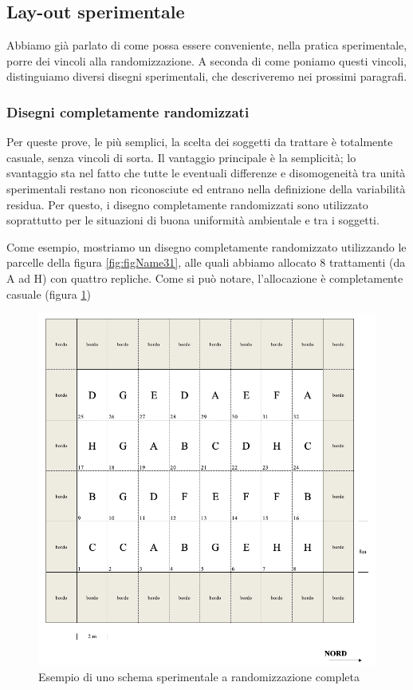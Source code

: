 \documentclass[a4paper,12pt,oneside]{book}
\begin{document}
\hypertarget{lay-out-sperimentale}{%
\subsection{Lay-out sperimentale}\label{lay-out-sperimentale}}

Abbiamo già parlato di come possa essere conveniente, nella pratica sperimentale, porre dei vincoli alla randomizzazione. A seconda di come poniamo questi vincoli, distinguiamo diversi disegni sperimentali, che descriveremo nei prossimi paragrafi.

\hypertarget{disegni-completamente-randomizzati}{%
\subsubsection{Disegni completamente randomizzati}\label{disegni-completamente-randomizzati}}

Per queste prove, le più semplici, la scelta dei soggetti da trattare è totalmente casuale, senza vincoli di sorta. Il vantaggio principale è la semplicità; lo svantaggio sta nel fatto che tutte le eventuali differenze e disomogeneità tra unità sperimentali restano non riconosciute ed entrano nella definizione della variabilità residua. Per questo, i disegno completamente randomizzati sono utilizzato soprattutto per le situazioni di buona uniformità ambientale e tra i soggetti.

Come esempio, mostriamo un disegno completamente randomizzato utilizzando le parcelle della figura \ref{fig:figName31}, alle quali abbiamo allocato 8 trattamenti (da A ad H) con quattro repliche. Come si può notare, l'allocazione è completamente casuale (figura \ref{fig:figName33})

\begin{figure}

{\centering \includegraphics[width=0.9\linewidth]{_images/Mappa1CRD} 

}

\caption{Esempio di uno schema sperimentale a randomizzazione completa}\label{fig:figName33}
\end{figure}
\end{document}
